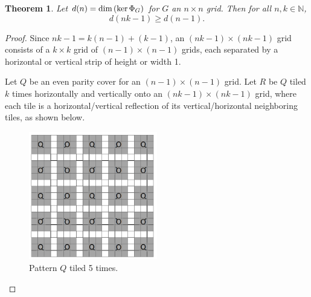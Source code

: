 \documentclass[a4paper]{article}
\newtheorem{theorem}{Theorem}[section]
\newcommand{\N}{\mathbb{N}}
\renewcommand{\dim}[1]{\textnormal{dim}\left( #1 \right)}
\begin{document}
	\begin{theorem}\label{tiling-quiet-patterns}
		Let $d(n) = \dim{\ker{\Phi_G}}$ for $G$ an $n \times n$ grid.
		Then for all $n,k \in \N$,
		\begin{equation*}
			d(nk - 1) \geq d(n-1).
		\end{equation*}
	\end{theorem}
	\begin{proof}
		Since $nk - 1 = k(n-1) + (k-1)$, an $(nk-1) \times (nk-1)$ grid consists of a $k \times k$ grid of $(n-1) \times (n-1)$ grids, each separated by a horizontal or vertical strip of height or width 1.
	
		Let $Q$ be an even parity cover for an $(n-1) \times (n-1)$ grid.
		Let $R$ be $Q$ tiled $k$ times horizontally and vertically onto an $(nk-1) \times (nk-1)$ grid, where each tile is a horizontal/vertical reflection of its vertical/horizontal neighboring tiles, as shown below.
		
		\begin{figure}[H]
			\centering
%				
%				
%						
			\includegraphics[width=0.5\textwidth]{tiling_q.png}
			\caption{Pattern $Q$ tiled 5 times.}	
		\end{figure}
	

\end{proof}
\end{document}
